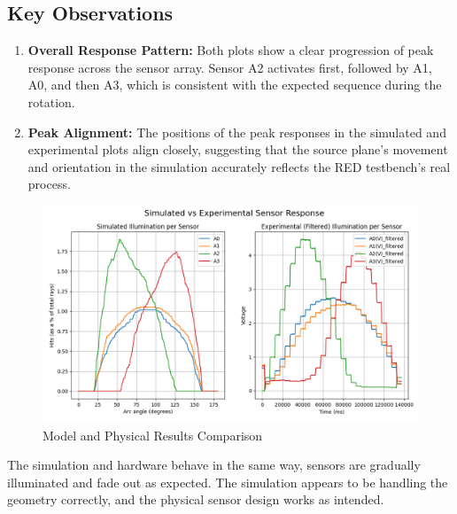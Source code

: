 \subsection*{Key Observations}
\begin{enumerate}
    \item \textbf{Overall Response Pattern:} Both plots show a clear progression of peak response across the sensor array. Sensor A2 activates first, followed by A1, A0, and then A3, which is consistent with the expected sequence during the rotation.
    
    \item \textbf{Peak Alignment:} The positions of the peak responses in the simulated and experimental plots align closely, suggesting that the source plane's movement and orientation in the simulation accurately reflects the RED testbench's real process.

\end{enumerate}
 \begin{landscape}
    \begin{figure}[htbp] %
        \centering
        \includegraphics[width=1.4\textwidth]{chapters/results/images/Comparison_plot.png} %
        \caption{Model and Physical Results Comparison}       %
        \label{fig:ModelandPhysicalResultsComparison}            %
    \end{figure}
 \end{landscape}

The simulation and hardware behave in the same way, sensors are gradually illuminated and fade out as expected. The simulation appears to be handling the geometry correctly, and the physical sensor design works as intended.



